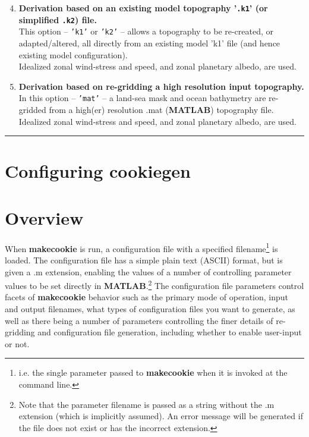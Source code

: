 \begin{enumerate}[noitemsep]
\setlength{\itemindent}{.2in}
\setcounter{enumi}{3}
\vspace{1mm}
\item \textbf{Derivation based on an existing model topography '\texttt{.k1}' (or simplified \texttt{.k2}) file.}
\\ This option -- \texttt{'k1'} or \texttt{'k2'} -- allows a topography to be re-created, or adapted/altered, all directly from an existing model 'k1' file (and hence existing model configuration).\\Idealized zonal wind-stress and speed, and zonal planetary albedo, are used.
\vspace{1mm}
\item \textbf{Derivation based on re-gridding a high resolution input topography.}
\\ In this option -- \texttt{'mat'} -- a land-sea mask and ocean bathymetry are re-gridded from a high(er) resolution \textsf{\footnotesize .mat} (\textbf{MATLAB}) topography file.\\Idealized zonal wind-stress and speed, and zonal planetary albedo, are used.
\end{enumerate}

\vspace{1mm}\noindent\rule{4cm}{0.5pt}\vspace{2mm}

\newpage

\section{Configuring cookiegen}


\section{Overview}

When \textbf{makecookie} is run, a configuration file with a specified filename\footnote{i.e. the single parameter passed to \textbf{makecookie} when it is invoked at the command line.} is loaded. The configuration file has a simple plain text (ASCII) format, but is given a \textsf{\footnotesize .m} extension, enabling the values of a number of controlling parameter values to be set directly in \textbf{MATLAB}.\footnote{Note that the parameter filename is passed as a string without the .m extension (which is implicitly assumed). An error message will be generated if the file does not exist or has the incorrect extension.} The configuration file parameters control facets of \textbf{makecookie} behavior such as the primary mode of operation, input and output filenames, what types of configuration files you want to generate, as well as there being a number of parameters controlling the finer details of re-gridding and configuration file generation, including whether to enable user-input or not.

